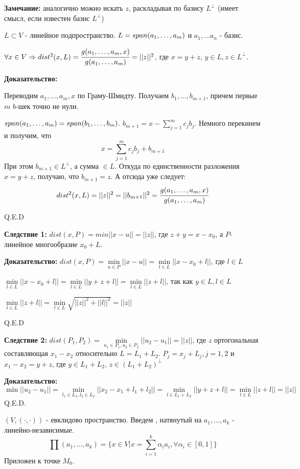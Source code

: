 \textbf{Замечание:} аналогично можно искать $z$, раскладывая по базису $L^\perp$ (имеет смысл, если известен базис $L^\perp$)



$L \subset V $ - линейное подпространство. $L= span (a_1,\ldots,a_m    )$ и $a_1,\ldots a_n$ - базис.

$\forall x \in V \Rightarrow dist^2(x,L) = \cfrac{g(a_1,\ldots, a_m,x)}{g(a_1,\ldots, a_m)} =||z||^2$, где $x = y+z$, $y\in L, z\in L^\perp$.

\textbf{Доказательство:}

Переводим $a_1,\ldots,a_m,x$ по Граму-Шмидту. Получаем $b_1,\ldots , b_{m+1}$, причем первые $m$ $b$-шек точно не нули. 

$span (a_1,\ldots , a_m) = span (b_1,\ldots, b_m)$. $b_{m+1} = x -\sum\limits_{j=1}^m c_j b_j$. Немного перекинем и получим, что
$$x =\sum\limits_{j=1}^m c_j b_j + b_{m+1} $$
При этом $b_{m+1}\in L^\perp$, а сумма $\in L$. Откуда по единственности разложения $x= y+z$, получаю, что $b_{m+1}=z$. А отсюда уже следует:
$$dist^2(x, L) = ||z||^2 = ||b_{m+1}||^2 = \cfrac{g(a_1,\ldots, a_m,x)}{g(a_1,\ldots, a_m)}$$

\hfill Q.E.D

\textbf{Следствие 1:} $dist(x, P ) = min ||x-u|| = ||z ||$, где $z+y= x-x_0$, а $P$- линейное многообразие $x_0+L$.

\textbf{Доказательство:}
$dist(x,P) = \min\limits_{u\in P}||x-u|| = \min\limits_{l\in L} ||x-x_0 + l||$, где $l \in L$

$\min\limits_{l\in L} ||x-x_0 + l||= \min\limits_{l\in L}||y+z + l|| = \min\limits_{l\in L}||z+l||$, так как $y \in L, l \in L$

$\min\limits_{l\in L}||z+l|| = \min\limits_{l \in L}\sqrt{||z||^2 + ||l||^2}= ||z||$

\hfill Q.E.D

\textbf{Следствие 2:} $dist (P_1, P_2) = \min\limits_{u_1\in P_1,u_2\in P_2}||u_2-u_1|| = ||z||$, где $z$ ортогональная составляющая $x_1-x_2$ относительно $L = L_1+L_2$. $P_j = x_j + L_j, j=1,2$ и $x_1-x_2 = y + z$, где $y\in L_1 + L_2$, $z \in (L_1 +L_2)^\perp$

\textbf{Доказательство:}
$$\min ||u_2-u_1|| = \min\limits_{l_1\in L_1,l_2\in L_2} ||x_2-x_1 + l_1 + l_2|| = \min\limits_{l\in L_1 +L_2}||y+z+l|| = \min\limits_{l\in L}||z+l|| =||z||$$
\hfill Q.E.D.

 $(V, (\cdot, \cdot))$ - евклидово пространство. Введем , натянутый на $a_1,\ldots,a_k$ - линейно-независимые.
$$\prod (a_1,\ldots, a_k) = \{x\in V | x = \sum\limits_{i=1}^k \alpha_i a_i, \forall \alpha_i \in [0,1]\}$$
Приложен к точке $M_0$.

